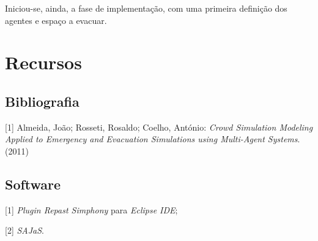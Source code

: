 \documentclass[12pt]{article}
\begin{document}
\begin{titlepage}
Iniciou-se, ainda, a fase de implementação, com uma primeira definição dos agentes e espaço a evacuar.



\section{Recursos}
\subsection{Bibliografia}
[1] Almeida, João; Rosseti, Rosaldo; Coelho, António: \textit{Crowd Simulation Modeling Applied to Emergency and Evacuation Simulations using Multi-Agent Systems}. (2011)

\subsection{Software}
[1] \textit{Plugin Repast Simphony} para \textit{Eclipse IDE};

[2] \textit{SAJaS}.

\end{titlepage}
\end{document}
